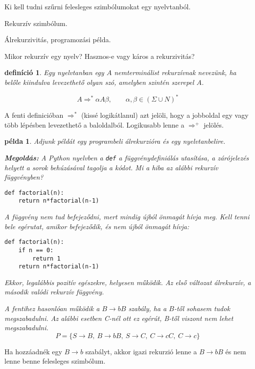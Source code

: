 \documentclass[a4paper]{article}
\newtheorem{pelda}{példa}[section]
\newtheorem{definicio}{definíció}[section]
\begin{document}
Ki kell tudni szűrni felesleges szimbólumokat egy nyelvtanból.

Rekurzív szimbólum.

Álrekurzivitás, programozási példa.

Mikor rekurzív egy nyelv? Hasznos-e vagy káros a rekurzivitás?

\vspace{2em}

\begin{definicio}
    Egy nyelvtanban egy $A$ nemterminálist rekurzívnak nevezünk, ha belőle
    kiindulva levezethető olyan szó, amelyben szintén szerepel $A$.

    \[A \Rightarrow^* \alpha A \beta,
    \qquad \alpha, \beta \in (\Sigma \cup N)^*\]
\end{definicio}

A fenti definicióban $\Rightarrow^*$ (kissé logikátlanul) azt jelöli,
hogy a jobboldal egy vagy több lépésben levezethető a baloldalból.
Logikusabb lenne a $\Rightarrow^+$ jelölés.

\begin{pelda}
Adjunk példát egy programbeli álrekurzióra és egy nyelvtanbelire.

\textbf{Megoldás:}
A Python nyelvben a \verb|def| a függvénydefiniálás utasítása, a
zárójelezés helyett a sorok behúzásával tagolja a kódot. Mi a hiba
az alábbi rekurzív függvényben?

\begin{verbatim}
def factorial(n):
    return n*factorial(n-1)
\end{verbatim}

A függvény nem tud befejeződni, mert mindig újból önmagát hívja meg.
Kell tenni bele egérutat, amikor befejeződik, és nem újból önmagát
hívja:

\begin{verbatim}
def factorial(n):
    if n == 0:
        return 1
    return n*factorial(n-1)
\end{verbatim}

Ekkor, legalábbis pozitív egészekre, helyesen működik. Az első változat
álrekurzív, a második valódi rekurzív függvény.

A fentihez hasonlóan működik a $B\to bB$ szabály, ha a $B$-től sohasem
tudok megszabadulni. Az alábbi esetben C-nél ott ez egérút, B-től
viszont nem lehet megszabadulni.
\[P=\{ S \to B,\: B\to bB ,\: S\to C,\: C\to cC,\: C\to c\}\]
\end{pelda}
\vspace{2em}
Ha hozzáadnék egy $B\to b$ szabályt, akkor igazi rekurzió lenne a $B\to
bB$ és nem lenne benne felesleges szimbólum.
\end{document}
